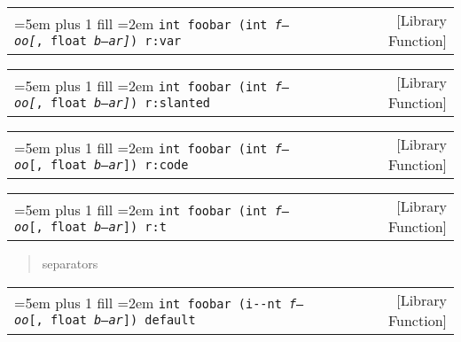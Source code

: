 \documentclass{book}
\newcommand\GNUTexinfocommandstyletextvar[1]{{\normalfont{}\textsl{#1}}}%
\begin{document}
%

\noindent\begin{tabularx}{\linewidth}{@{}Xr}
\rightskip=5em plus 1 fill
\hangindent=2em
\noindent\texttt{int foobar (int\ \GNUTexinfocommandstyletextvar{f---oo}\textnormal{\GNUTexinfocommandstyletextvar{[}},\ float\ \GNUTexinfocommandstyletextvar{b--ar}\textnormal{\GNUTexinfocommandstyletextvar{]}})\ r:var}& [Library Function]
\end{tabularx}

%

\noindent\begin{tabularx}{\linewidth}{@{}Xr}
\rightskip=5em plus 1 fill
\hangindent=2em
\noindent\texttt{int foobar (int\ \GNUTexinfocommandstyletextvar{f---oo}\textnormal{\textsl{[}},\ float\ \GNUTexinfocommandstyletextvar{b--ar}\textnormal{\textsl{]}})\ r:slanted}& [Library Function]
\end{tabularx}

%

\noindent\begin{tabularx}{\linewidth}{@{}Xr}
\rightskip=5em plus 1 fill
\hangindent=2em
\noindent\texttt{int foobar (int\ \GNUTexinfocommandstyletextvar{f---oo}\textnormal{\texttt{[}},\ float\ \GNUTexinfocommandstyletextvar{b--ar}\textnormal{\texttt{]}})\ r:code}& [Library Function]
\end{tabularx}

%

\noindent\begin{tabularx}{\linewidth}{@{}Xr}
\rightskip=5em plus 1 fill
\hangindent=2em
\noindent\texttt{int foobar (int\ \GNUTexinfocommandstyletextvar{f---oo}\textnormal{\texttt{[}},\ float\ \GNUTexinfocommandstyletextvar{b--ar}\textnormal{\texttt{]}})\ r:t}& [Library Function]
\end{tabularx}

%
\begin{quote}
\unskip{\parskip=0pt\noindent}%
separators
\end{quote}


\noindent\begin{tabularx}{\linewidth}{@{}Xr}
\rightskip=5em plus 1 fill
\hangindent=2em
\noindent\texttt{int foobar (i{-}{-}nt\ \GNUTexinfocommandstyletextvar{f---oo}[,\ float\ \GNUTexinfocommandstyletextvar{b--ar}])\ default}& [Library Function]
\end{tabularx}
\end{document}
